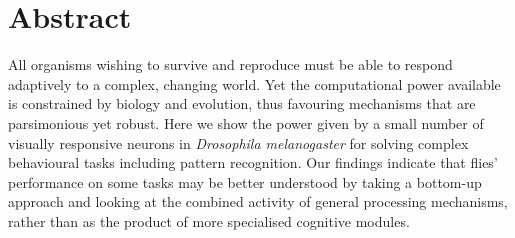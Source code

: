 \section*{Abstract}
All organisms wishing to survive and reproduce must be able to respond adaptively to a complex, changing world.
Yet the computational power available is constrained by biology and evolution, thus favouring mechanisms that are parsimonious yet robust.
Here we show the power given by a small number of visually responsive neurons in \emph{Drosophila melanogaster} for solving complex behavioural tasks including pattern recognition.
Our findings indicate that flies' performance on some tasks may be better understood by taking a bottom-up approach and looking at the combined activity of general processing mechanisms, rather than as the product of more specialised cognitive modules.

